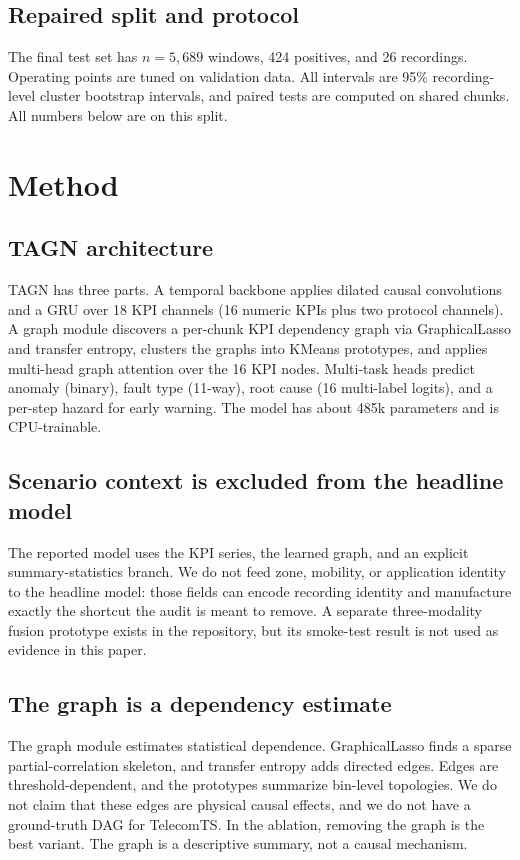 \documentclass[conference]{IEEEtran}
\begin{document}
\subsection{Repaired split and protocol}

The final test set has $n=5{,}689$ windows, 424 positives, and 26 recordings. Operating points are tuned on validation data. All intervals are 95\% recording-level cluster bootstrap intervals, and paired tests are computed on shared chunks. All numbers below are on this split.

\section{Method}

\subsection{TAGN architecture}

TAGN has three parts. A temporal backbone applies dilated causal convolutions and a GRU over 18 KPI channels (16 numeric KPIs plus two protocol channels). A graph module discovers a per-chunk KPI dependency graph via GraphicalLasso and transfer entropy, clusters the graphs into KMeans prototypes, and applies multi-head graph attention over the 16 KPI nodes. Multi-task heads predict anomaly (binary), fault type (11-way), root cause (16 multi-label logits), and a per-step hazard for early warning. The model has about 485k parameters and is CPU-trainable.

\subsection{Scenario context is excluded from the headline model}

The reported model uses the KPI series, the learned graph, and an explicit summary-statistics branch. We do not feed zone, mobility, or application identity to the headline model: those fields can encode recording identity and manufacture exactly the shortcut the audit is meant to remove. A separate three-modality fusion prototype exists in the repository, but its smoke-test result is not used as evidence in this paper.

\subsection{The graph is a dependency estimate}

The graph module estimates statistical dependence. GraphicalLasso finds a sparse partial-correlation skeleton, and transfer entropy adds directed edges. Edges are threshold-dependent, and the prototypes summarize bin-level topologies. We do not claim that these edges are physical causal effects, and we do not have a ground-truth DAG for TelecomTS. In the ablation, removing the graph is the best variant. The graph is a descriptive summary, not a causal mechanism.
\end{document}
